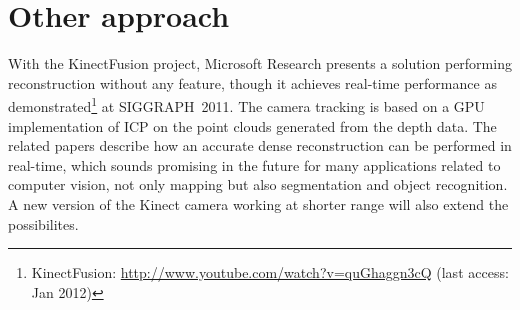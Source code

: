 \section{Other approach}

With the KinectFusion project, Microsoft Research presents a solution performing reconstruction without any feature, though it achieves real-time performance as demonstrated\footnote{KinectFusion: \url{http://www.youtube.com/watch?v=quGhaggn3cQ} (last access: Jan 2012)} at SIGGRAPH~2011. The camera tracking is based on a GPU implementation of \gls{ICP} on the point clouds generated from the depth data. The related papers \cite{Izadi_2011_SIGGRAPH} \cite{Newcombe_2011_ISMAR} describe how an accurate dense reconstruction can be performed in real-time, which sounds promising in the future for many applications related to computer vision, not only mapping but also segmentation and object recognition. A new version of the Kinect camera working at shorter range will also extend the possibilites.
